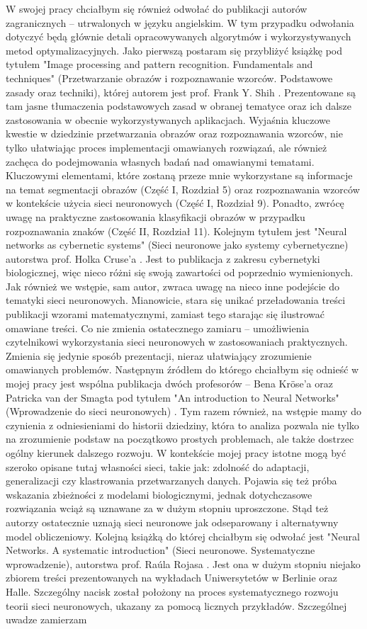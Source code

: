 W swojej pracy chciałbym się również odwołać do publikacji autorów zagranicznych -- utrwalonych w języku angielskim. W tym przypadku odwołania dotyczyć będą głównie detali opracowywanych algorytmów i wykorzystywanych metod optymalizacyjnych. Jako pierwszą postaram się przybliżyć książkę pod tytułem "Image processing and pattern recognition. Fundamentals and techniques" (Przetwarzanie obrazów i rozpoznawanie wzorców. Podstawowe zasady oraz techniki), której autorem jest prof. Frank Y. Shih \cite{Shi10}. Prezentowane są tam jasne tłumaczenia podstawowych zasad w obranej tematyce oraz ich dalsze zastosowania w obecnie wykorzystywanych aplikacjach. Wyjaśnia kluczowe kwestie w dziedzinie przetwarzania obrazów oraz rozpoznawania wzorców, nie tylko ułatwiając proces implementacji omawianych rozwiązań, ale również zachęca do podejmowania własnych badań nad omawianymi tematami. Kluczowymi elementami, które zostaną przeze mnie wykorzystane są informacje na temat segmentacji obrazów (Część I, Rozdział 5) oraz rozpoznawania wzorców w kontekście użycia sieci neuronowych (Część I, Rozdział 9). Ponadto, zwrócę uwagę na praktyczne zastosowania klasyfikacji obrazów w przypadku rozpoznawania znaków (Część II, Rozdział 11). Kolejnym tytułem jest "Neural networks as cybernetic systems" (Sieci neuronowe jako systemy cybernetyczne) autorstwa prof. Holka Cruse'a \cite{Cru06}. Jest to publikacja z zakresu cybernetyki biologicznej, więc nieco różni się swoją zawartości od poprzednio wymienionych. Jak również we wstępie, sam autor, zwraca uwagę na nieco inne podejście do tematyki sieci neuronowych. Mianowicie, stara się unikać przeładowania treści publikacji wzorami matematycznymi, zamiast tego starając się ilustrować omawiane treści. Co nie zmienia ostatecznego zamiaru -- umożliwienia czytelnikowi wykorzystania sieci neuronowych w zastosowaniach praktycznych. Zmienia się jedynie sposób prezentacji, nieraz ułatwiający zrozumienie omawianych problemów. Następnym źródłem do którego chciałbym się odnieść w mojej pracy jest wspólna publikacja dwóch profesorów -- Bena Kröse'a oraz Patricka van der Smagta pod tytułem "An introduction to Neural Networks" (Wprowadzenie do sieci neuronowych) \cite{KaS96}. Tym razem również, na wstępie mamy do czynienia z odniesieniami do historii dziedziny, która to analiza pozwala nie tylko na zrozumienie podstaw na początkowo prostych problemach, ale także dostrzec ogólny kierunek dalszego rozwoju. W kontekście mojej pracy istotne mogą być szeroko opisane tutaj własności sieci, takie jak: zdolność do adaptacji, generalizacji czy klastrowania przetwarzanych danych. Pojawia się też próba wskazania zbieżności z modelami biologicznymi, jednak dotychczasowe rozwiązania wciąż są uznawane za w dużym stopniu uproszczone. Stąd też autorzy ostatecznie uznają sieci neuronowe jak odseparowany i alternatywny model obliczeniowy. Kolejną książką do której chciałbym się odwołać jest "Neural Networks. A systematic introduction" (Sieci neuronowe. Systematyczne wprowadzenie), autorstwa prof. Raúla Rojasa \cite{Roj96}. Jest ona w dużym stopniu niejako zbiorem treści prezentowanych na wykładach Uniwersytetów w Berlinie oraz Halle. Szczególny nacisk został położony na proces systematycznego rozwoju teorii sieci neuronowych, ukazany za pomocą licznych przykładów. Szczególnej uwadze zamierzam 